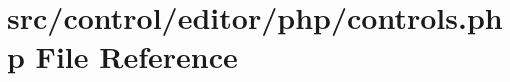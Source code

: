 \hypertarget{controls_8php}{}\section{src/control/editor/php/controls.php File Reference}
\label{controls_8php}
